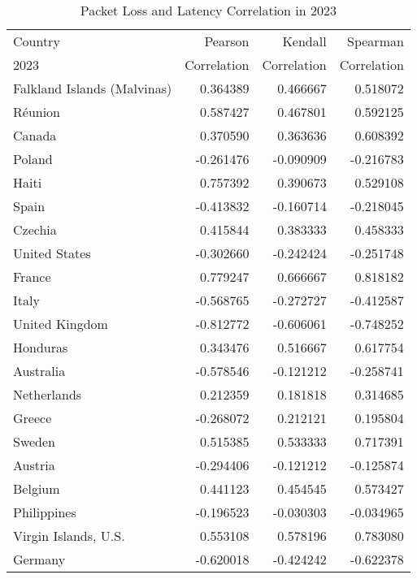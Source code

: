 \begin{table}
	\footnotesize
	\caption{Packet Loss and Latency Correlation in 2023}
	\label{fig:packetloss-latency-correlation-2023}
	\begin{tabular}{lrrr}
		\toprule
		Country                     & Pearson     & Kendall     & Spearman    \\
		2023                        & Correlation & Correlation & Correlation \\
		\midrule
		Falkland Islands (Malvinas) & 0.364389    & 0.466667    & 0.518072    \\
		Réunion                     & 0.587427    & 0.467801    & 0.592125    \\
		Canada                      & 0.370590    & 0.363636    & 0.608392    \\
		Poland                      & -0.261476   & -0.090909   & -0.216783   \\
		Haiti                       & 0.757392    & 0.390673    & 0.529108    \\
		Spain                       & -0.413832   & -0.160714   & -0.218045   \\
		Czechia                     & 0.415844    & 0.383333    & 0.458333    \\
		United States               & -0.302660   & -0.242424   & -0.251748   \\
		France                      & 0.779247    & 0.666667    & 0.818182    \\
		Italy                       & -0.568765   & -0.272727   & -0.412587   \\
		United Kingdom              & -0.812772   & -0.606061   & -0.748252   \\
		Honduras                    & 0.343476    & 0.516667    & 0.617754    \\
		Australia                   & -0.578546   & -0.121212   & -0.258741   \\
		Netherlands                 & 0.212359    & 0.181818    & 0.314685    \\
		Greece                      & -0.268072   & 0.212121    & 0.195804    \\
		Sweden                      & 0.515385    & 0.533333    & 0.717391    \\
		Austria                     & -0.294406   & -0.121212   & -0.125874   \\
		Belgium                     & 0.441123    & 0.454545    & 0.573427    \\
		Philippines                 & -0.196523   & -0.030303   & -0.034965   \\
		Virgin Islands, U.S.        & 0.553108    & 0.578196    & 0.783080    \\
		Germany                     & -0.620018   & -0.424242   & -0.622378   \\
		\bottomrule
	\end{tabular}
\end{table}

